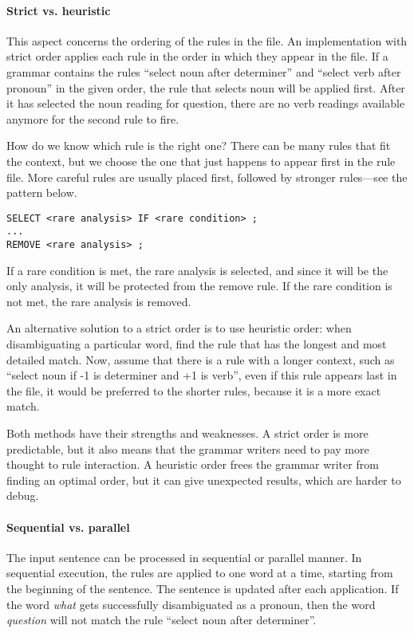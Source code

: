 \paragraph{Strict vs. heuristic}

This aspect concerns the ordering of the rules in the file. An implementation with strict order applies each rule in the order in which they appear in the file. If a grammar contains the rules “select noun after determiner” and “select verb after pronoun” in the given order, the rule that selects noun will be applied first. After it has selected the noun reading for question, there are no verb readings available anymore for the second rule to fire.
					
How do we know which rule is the right one? There can be many rules that fit the context, but we choose the one that just happens to appear first in the rule file. More careful rules are usually placed first, followed by stronger rules—see the pattern below.

\begin{verbatim}					
SELECT <rare analysis> IF <rare condition> ;
...
REMOVE <rare analysis> ;
\end{verbatim}
If a rare condition is met, the rare analysis is selected, and since it will be the only analysis, it will be protected from the remove rule. If the rare condition is not met, the rare analysis is removed.
					
An alternative solution to a strict order is to use heuristic order: when disambiguating a particular word, find the rule that has the longest and most detailed match. Now, assume that there is a rule with a longer context, such as “select noun if -1 is determiner and +1 is verb”, even if this rule appears last in the file, it would be preferred to the shorter rules, because it is a more exact match.
					
Both methods have their strengths and weaknesses. A strict order is more predictable, but it also means that the grammar writers need to pay more thought to rule interaction. A heuristic order frees the grammar writer from finding an optimal order, but it can give unexpected results, which are harder to debug.


\paragraph{Sequential vs. parallel}

The input sentence can be processed in sequential or parallel manner. In sequential execution, the rules are applied to one word at a time, starting from the beginning of the sentence. The sentence is updated after each application. If the word \emph{what} gets successfully disambiguated as a pronoun, then the word \emph{question} will not match the rule ``select noun after determiner''.

